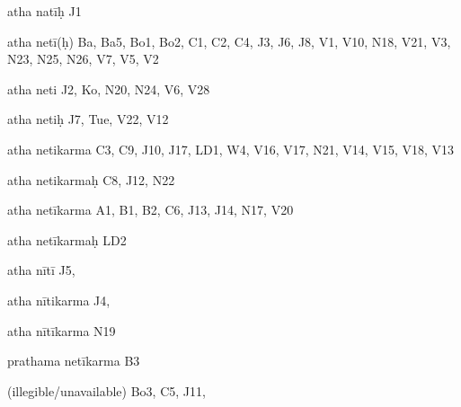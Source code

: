 \begin{ekdosis}
\begin{marma}[hp01_055]
\begin{marma}[hp02_009]
\begin{marma}[hp02_011]
      \begin{marma}[hp02_30]
      \item[atha natīḥ] J1
      \item[atha netī(ḥ)] Ba, Ba5, Bo1, Bo2, C1, C2, C4, J3, J6, J8, V1, V10, N18, V21, V3, N23, N25, N26, V7, V5, V2
      \item[atha neti] J2, Ko, N20, N24, V6, V28
      \item[atha netiḥ] J7, Tue, V22, V12
      \item[atha netikarma] C3, C9, J10, J17, LD1, W4, V16, V17, N21, V14, V15, V18, V13
      \item[atha netikarmaḥ] C8, J12, N22
      \item[atha netīkarma] A1, B1, B2, C6, J13, J14, N17, V20
      \item[atha netīkarmaḥ] LD2
      \item[atha nītī] J5,
      \item[atha nītikarma] J4,
      \item[atha nītīkarma] N19
      \item[prathama netīkarma] B3
      \item[(illegible/unavailable)] Bo3, C5, J11, 
        \begin{description}

        \end{description}
      \end{marma}


\end{marma}
\end{marma}
\end{marma}
\end{ekdosis}
